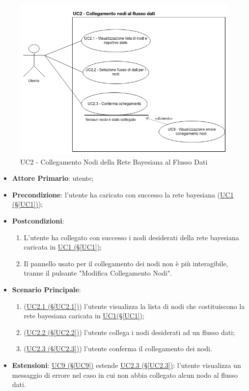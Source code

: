 \begin{figure}[H]
\centering
\includegraphics[scale=0.5]{./images/UC2.png}
\caption{UC2 - Collegamento Nodi della Rete Bayesiana al Flusso Dati}
\end{figure}

\begin{itemize}
\item \textbf{Attore Primario}: utente;
\item \textbf{Precondizione}: l'utente ha caricato con successo la rete bayesiana (\hyperref[UC1]{UC1 (§\ref*{UC1})});
\item \textbf{Postcondizioni}: 
	\begin{enumerate}
	\item L'utente ha collegato con successo i nodi desiderati della rete bayesiana caricata in \hyperref[UC1]{UC1 				(§\ref*{UC1})};
	\item Il pannello usato per il collegamento dei nodi non è più interagibile, tranne il pulsante "Modifica 							Collegamento Nodi".
	\end{enumerate}
\item \textbf{Scenario Principale}:
	\begin{enumerate}
	\item (\hyperref[UC2.1]{UC2.1 (§\ref*{UC2.1})}) l'utente visualizza la lista di nodi che costituiscono la rete bayesiana caricata in \hyperref[UC1]{UC1(§\ref*{UC1})};
	\item (\hyperref[UC2.2]{UC2.2 (§\ref*{UC2.2})}) l'utente collega i nodi desiderati ad un flusso dati;
	\item (\hyperref[UC2.3]{UC2.3 (§\ref*{UC2.3})}) l'utente conferma il collegamento dei nodi.
	\end{enumerate}
\item \textbf{Estensioni}: \hyperref[UC9]{UC9 (§\ref*{UC9})} estende \hyperref[UC2.3]{UC2.3 (§\ref*{UC2.3})}: l'utente visualizza un messaggio di errore nel caso in cui non abbia collegato alcun nodo al flusso dati.
\end{itemize}

